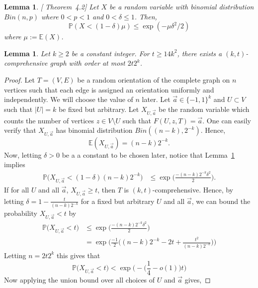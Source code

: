 \documentclass[11pt]{article}
\newtheorem{lemma}[theorem]{Lemma}
\theoremstyle{definition}
\begin{document}
\begin{lemma}\label{Lemma: Chernoff's Bound}[\cite{motwani1995randomized} Theorem~4.2]
    Let $X$ be a random variable with binomial distribution $Bin(n,p)$ where $0<p<1$ and $0 < \delta \leq 1$. Then, $$\mathbb{P}(X < (1-\delta)\mu) \leq \exp(-\mu\delta^2/2)$$
    where $\mu := \mathbb{E}(X)$.
\end{lemma}

\begin{lemma}\label{Lemma: exists comprehensive}
    Let $k\geq 2$ be a constant integer.
    For $t\geq 14k^2$,
    there exists a $(k,t)$-comprehensive graph with order at most 
    $2t2^k$.
\end{lemma}

\begin{proof}
    Let $T = (V,E)$ be a random orientation of the complete graph on $n$ vertices such that each edge is assigned an orientation uniformly and independently. We will choose the value of $n$ later. Let ${\vec a} \in \{-1,1\}^{k}$ and $U \subset V$ such that $|U| = k$ be fixed but arbitrary. Let $X_{U,{\vec a}}$ be the random variable which counts the number of vertices $z \in V\setminus U$ such that $F(U,z,T) = {\vec a}$.
    One can easily verify that $X_{U,{\vec a}}$ has binomial distribution $Bin((n-k),2^{-k})$.
    Hence,
    \[
    \mathbb{E}(X_{U,{\vec a}}) = (n-k)2^{-k}.
    \]
    Now, letting $\delta >0$ be a a constant to be chosen later, notice that Lemma~\ref{Lemma: Chernoff's Bound} implies
    \begin{align*}
        \mathbb{P}\Big(X_{U,{\vec a}} < (1-\delta)(n-k)2^{-k}\Big) & \leq \exp\Bigg(\frac{-(n-k)2^{-k}\delta^2}{2}\Bigg).
    \end{align*}
    If for all $U$ and all $\vec{a}$, $X_{U,\vec{a}}\geq t$, then $T$ is $(k,t)$-comprehensive.
    Hence, by letting $\delta = 1 - \frac{t}{(n-k)2^{-k}}$ for a fixed but arbitrary $U$ and all $\vec{a}$,
    we can bound the probability $X_{U,\vec{a}} < t$ by 
    \begin{align*}
        \mathbb{P}\Big(X_{U,{\vec a}} < t\Big) & \leq \exp\Bigg(\frac{-(n-k)2^{-k}\delta^2}{2}\Bigg) \\
        & = \exp\Bigg( \frac{-1}{2}\Big((n-k)2^{-k} - 2t + \frac{t^2}{(n-k)2^{-k}}\Big) \Bigg)
    \end{align*}
    Letting $n = 2t2^k$ this gives that
    \[
    \mathbb{P}\Big(X_{U,{\vec a}} < t\Big)  < \exp\Big( -\Big(\frac{1}{4} - o(1)\Big)t \Big)
    \]
    Now applying the union bound over all choices of $U$ and $\vec{a}$ gives,

\end{proof}
\end{document}
